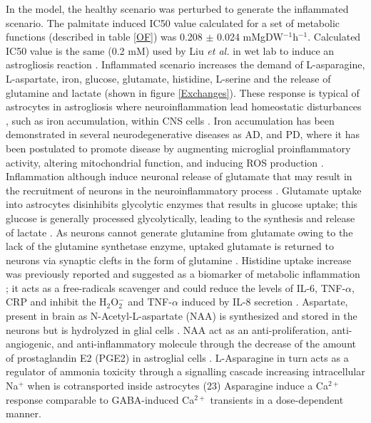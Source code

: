 In the model, the healthy scenario was perturbed to generate the inflammated scenario. The palmitate induced IC50 value calculated for a set of metabolic functions (described in table \ref{OF}) was 0.208 $\pm$ 0.024 mMgDW$^{-1}$h$^{-1}$. Calculated IC50 value is the same (0.2 mM) used by Liu \emph{et al.} in wet lab to induce an astrogliosis reaction \cite{Liu2013}. Inflammated scenario increases the demand of L-asparagine, L-aspartate, iron, glucose, glutamate, histidine, L-serine and the release of glutamine and lactate (shown in figure \ref{Exchanges}). These response is typical of astrocytes in astrogliosis where neuroinflammation lead homeostatic disturbances \cite{Rangel-Aldao2015}, such as iron accumulation, within CNS cells \cite{Jha2016}. Iron accumulation has been demonstrated in several neurodegenerative diseases as AD, and PD, where it has been postulated to promote disease by augmenting microglial proinflammatory activity, altering mitochondrial function, and inducing ROS production \cite{Williams2012}.
Inflammation although induce neuronal release of glutamate that may result in the recruitment of neurons in the neuroinflammatory process \cite{Parpura2000}. Glutamate uptake into astrocytes disinhibits glycolytic enzymes that results in glucose uptake;  this glucose is generally processed glycolytically, leading to the synthesis and release of lactate \cite{Jha2016}. As neurons cannot generate glutamine from glutamate owing to the lack of the glutamine synthetase enzyme, uptaked glutamate is returned to neurons via synaptic clefts in the form of glutamine \cite{Hertz1999}.
Histidine uptake increase was previously reported and suggested as a biomarker of metabolic inflammation \cite{Niu2012}; it acts as a free-radicals scavenger and could reduce the levels of IL-6, TNF-$\alpha$, CRP and inhibit the H$_2$O$_2^-$ and TNF-$\alpha$ induced by IL-8 secretion \cite{Lee2005,Son2005}. Aspartate, present in brain as N-Acetyl-L-aspartate (NAA) is synthesized and stored in the neurons but is hydrolyzed in glial cells \cite{Baslow2003}. NAA act as an anti-proliferation, anti-angiogenic, and anti-inflammatory molecule through the decrease of the amount of prostaglandin E2 (PGE2) in astroglial cells \cite{Rael2004}. L-Asparagine in turn acts as a regulator of ammonia toxicity through a signalling cascade increasing intracellular Na$^+$ when is cotransported inside astrocytes (23) Asparagine induce a Ca$^{2+}$ response comparable to GABA-induced Ca$^{2+}$ transients in a dose-dependent manner.

